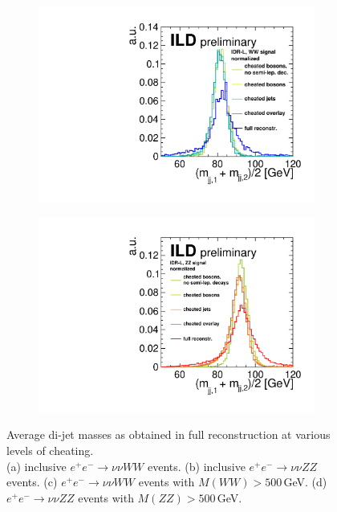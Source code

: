 \begin{figure}[htbp]
\begin{center}
\begin{subfigure}{0.495\hsize} \includegraphics[width=\textwidth]{Performance/fig/l_WW_cheating_steps_highQ2.pdf}
 \caption{ \label{fig:qgc:cheat:WWQ2}}
 \end{subfigure}
\begin{subfigure}{0.495\hsize} \includegraphics[width=\textwidth]{Performance/fig/l_ZZ_cheating_steps_highQ2.pdf}
 \caption{  \label{fig:qgc:cheat:ZZQ2}}
 \end{subfigure}
\end{center}
\caption{Average di-jet masses as obtained in full reconstruction at various levels of cheating.\\
(a) inclusive $e^+e^- \to \nu\nu WW$ events. 
(b) inclusive $e^+e^- \to \nu\nu ZZ$ events.
(c)  $e^+e^- \to \nu\nu WW$ events with $M(WW)>500$\,GeV. 
(d)  $e^+e^- \to \nu\nu ZZ$ events with $M(ZZ)>500$\,GeV.
}
\label{fig:qgc:cheatWWZZ}
\end{figure}

